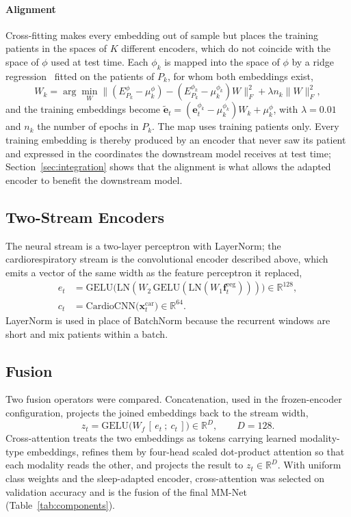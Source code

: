 \documentclass[a4paper,fleqn]{cas-sc}
\begin{document}
\paragraph{Alignment} Cross-fitting makes every embedding out of sample but places the
training patients in the spaces of $K$ different encoders, which do not coincide with the
space of $\phi$ used at test time. Each $\phi_k$ is mapped into the space of $\phi$ by a ridge
regression~\cite{hoerl1970ridge} fitted on the patients of $P_k$, for whom both embeddings
exist,
\begin{equation}
W_k=\arg\min_W\big\lVert(E^{\phi}_{P_k}-\mu^{\phi}_k)-(E^{\phi_k}_{P_k}-\mu^{\phi_k}_k)W\big\rVert_F^2
+\lambda n_k\lVert W\rVert_F^2,
\end{equation}
and the training embeddings become
$\tilde{\mathbf{e}}_t=(\mathbf{e}^{\phi_k}_t-\mu^{\phi_k}_k)W_k+\mu^{\phi}_k$, with $\lambda=0.01$
and $n_k$ the number of epochs in $P_k$. The map uses training patients only. Every training
embedding is thereby produced by an encoder that never saw its patient and expressed in the
coordinates the downstream model receives at test time; Section~\ref{sec:integration} shows that
the alignment is what allows the adapted encoder to benefit the downstream model.

\subsection{Two-Stream Encoders}
The neural stream is a two-layer perceptron with LayerNorm; the cardiorespiratory stream is the convolutional encoder described above, which emits a vector of the same width as the feature perceptron it replaced,
\begin{align}
e_t&=\mathrm{GELU}\!\big(\mathrm{LN}(W_2\,\mathrm{GELU}(\mathrm{LN}(W_1\mathbf{f}^{\mathrm{eeg}}_t))) \big)\in\mathbb{R}^{128},\\
c_t&=\mathrm{CardioCNN}\big(\mathbf{x}^{\mathrm{car}}_t\big)\in\mathbb{R}^{64}.
\end{align}
LayerNorm is used in place of BatchNorm because the recurrent windows are short and mix patients
within a batch.

\subsection{Fusion}
Two fusion operators were compared. Concatenation, used in the frozen-encoder configuration,
projects the joined embeddings back to the stream width,
\begin{equation}
z_t=\mathrm{GELU}\!\big(W_f\,[\,e_t\ ;\ c_t\,]\big)\in\mathbb{R}^{D},\qquad D=128.
\end{equation}
Cross-attention treats the two embeddings as tokens carrying learned modality-type
embeddings, refines them by four-head scaled dot-product attention so that each modality
reads the other, and projects the result to $z_t\in\mathbb{R}^{D}$. With uniform class weights
and the sleep-adapted encoder, cross-attention was selected on validation accuracy and is the
fusion of the final MM-Net (Table~\ref{tab:components}).
\end{document}
